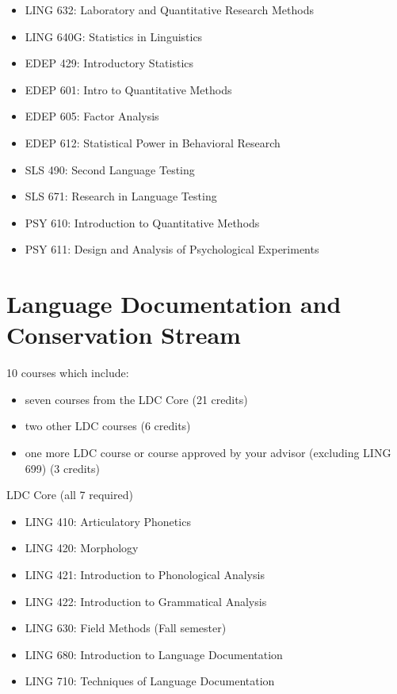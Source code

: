 \documentclass[
]{book}
\providecommand{\tightlist}{%
  \setlength{\itemsep}{0pt}\setlength{\parskip}{0pt}}
\begin{document}
\begin{itemize}
\tightlist
\item
  LING 632: Laboratory and Quantitative Research Methods
\item
  LING 640G: Statistics in Linguistics
\item
  EDEP 429: Introductory Statistics
\item
  EDEP 601: Intro to Quantitative Methods
\item
  EDEP 605: Factor Analysis
\item
  EDEP 612: Statistical Power in Behavioral Research
\item
  SLS 490: Second Language Testing
\item
  SLS 671: Research in Language Testing
\item
  PSY 610: Introduction to Quantitative Methods
\item
  PSY 611: Design and Analysis of Psychological Experiments
\end{itemize}

\section{Language Documentation and Conservation Stream}\label{language-documentation-and-conservation-stream}

10 courses which include:

\begin{itemize}
\tightlist
\item
  seven courses from the LDC Core (21 credits)
\item
  two other LDC courses (6 credits)
\item
  one more LDC course or course approved by your advisor (excluding LING 699) (3 credits)
\end{itemize}

LDC Core (all 7 required)

\begin{itemize}
\tightlist
\item
  LING 410: Articulatory Phonetics
\item
  LING 420: Morphology
\item
  LING 421: Introduction to Phonological Analysis
\item
  LING 422: Introduction to Grammatical Analysis
\item
  LING 630: Field Methods (Fall semester)
\item
  LING 680: Introduction to Language Documentation
\item
  LING 710: Techniques of Language Documentation
\end{itemize}
\end{document}
